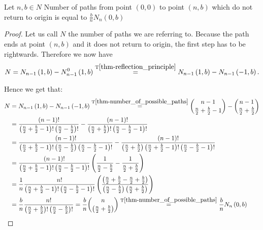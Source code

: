 \begin{thm}\label{thm-ballot_theorem}
 Let $n,b \in N$
 Number of paths from point $ \left( 0,0 \right) $ to point $ \left( n,b \right) $ which do not return to origin is equal to $\frac{b}{n}N_n \left( 0,b \right) $
\end{thm}
\begin{proof}
 Let us call $N$ the number of paths we are referring to.
 Because the path ends at point $ \left( n,b \right) $ and it does not return to origin, the first step has to be rightwards. Therefore we now have
 \[
    N=N_{n-1} \left( 1,b \right) -N_{n-1}^0 \left( 1,b \right) \overset{\text{T}\ref{thm-reflection_principle}}{=}N_{n-1} \left( 1,b \right) -N_{n-1} \left( -1,b \right).
\]


 Hence we get that:
 \[
 \begin{split}
 N & = N_{n-1} \left( 1,b \right) -N_{n-1} \left( -1,b \right)
 \overset{\text{T}\ref{thm-number_of_possible_paths}}{=} \binom{n-1}{\frac{n}{2}+\frac{b}{2}-1}-\binom{n-1}{\frac{n}{2}+\frac{b}{2}}\\
 & =\frac{ \left( n-1 \right) !}{ \left( \frac{n}{2}+\frac{b}{2}-1 \right) ! \left( \frac{n}{2}-\frac{b}{2} \right) !}-\frac{ \left( n-1 \right) !}{ \left( \frac{n}{2}+\frac{b}{2} \right) ! \left( \frac{n}{2}-\frac{b}{2}-1 \right) !}\\
 & =\frac{ \left( n-1 \right) !}{ \left( \frac{n}{2}+\frac{b}{2}-1 \right) ! \left( \frac{n}{2}-\frac{b}{2} \right) \left( \frac{n}{2}-\frac{b}{2}-1 \right) !}-\frac{ \left( n-1 \right) !}{ \left( \frac{n}{2}+\frac{b}{2} \right) \left( \frac{n}{2}+\frac{b}{2}-1 \right) ! \left( \frac{n}{2}-\frac{b}{2}-1 \right) !}\\
 & =\frac{ \left( n-1 \right) !}{ \left( \frac{n}{2}+\frac{b}{2}-1 \right) ! \left( \frac{n}{2}-\frac{b}{2}-1 \right) !} \left( \frac{1}{\frac{n}{2}-\frac{b}{2}}-\frac{1}{\frac{n}{2}+\frac{b}{2}} \right) \\
 & =\frac{1}{n}\frac{n!}{ \left( \frac{n}{2}+\frac{b}{2}-1 \right) ! \left( \frac{n}{2}-\frac{b}{2}-1 \right) !} \left( \frac{ \left( \frac{n}{2}+\frac{b}{2}-\frac{n}{2}+\frac{b}{2} \right) }{ \left( \frac{n}{2}-\frac{b}{2} \right) \left( \frac{n}{2}+\frac{b}{2} \right)} \right)\\
 & =\frac{b}{n}\frac{n!}{ \left( \frac{n}{2}+\frac{b}{2} \right) ! \left( \frac{n}{2}-\frac{b}{2} \right) !}=\frac{b}{n}\binom{n}{ \left( \frac{n}{2}+\frac{b}{2} \right)}
 \overset{\text{T}\ref{thm-number_of_possible_paths}}{=} \frac{b}{n}N_n \left( 0,b \right)
\end{split}
 \]
\end{proof}
